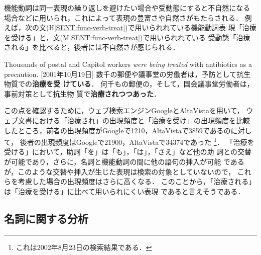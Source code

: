 機能動詞は同一表現の繰り返しを避けたい場合や受動態にすると不自然になる
場合などに用いられ，これによって表現の豊富さや自然さがもたらされる．
例えば，次の文(H\ref{SENT:func-verb-treat})で用いられれている機能動詞表
現「治療を受ける」と，文(M\ref{SENT:func-verb-treat})で用いられれている
受動態「治療される」を比べると，後者には不自然さが感じられる．
\begin{SENT2}
\sentE Thousands of postal and Capitol workers {\it were being treated} 
with antibiotics as a precaution. [2001年10月19日]
\sentH 数千の郵便や議事堂の労働者は，予防として抗生物質での{\bf 治療を受
けている}． 
\sentM 何千もの郵便の，そして，国会議事堂労働者は，事前対策として抗生物
質で{\bf 治療されつつあった}．
\label{SENT:func-verb-treat}
\end{SENT2}

この点を確認するために，ウェブ検索エンジンGoogleとAltaVistaを用いて，
ウェブ文書における「治療され」の出現頻度と「治療を受け」の出現頻度を比較
したところ，前者の出現頻度がGoogleで1210，AltaVistaで3859であるのに対して， 
後者の出現頻度はGoogleで21900，AltaVistaで34374であった
\footnote{これは2002年8月23日の検索結果である．}．
「治療を受ける」において，助詞「を」は「も」，「は」，「さえ」など他の助
詞との交替が可能であり，さらに，名詞と機能動詞の間に他の語句の挿入が可能
であるが，このような交替や挿入が生じた表現は検索の対象としていないので，
これらを考慮した場合の出現頻度はさらに高くなる．
このことから，「治療される」は「治療を受ける」に比べて用いられにくい表現
であると言えそうである．


\newpage
\subsection{名詞に関する分析}
\label{sec:result:noun}

